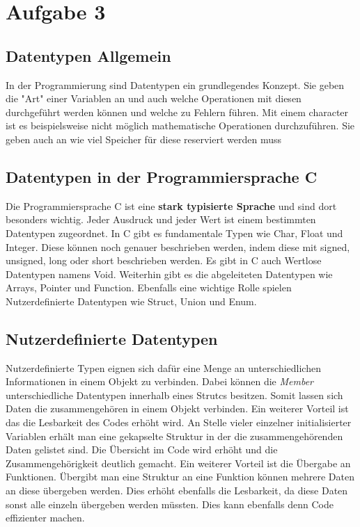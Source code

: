 \chapter{Aufgabe 3}
\section{Datentypen Allgemein}
In der Programmierung sind Datentypen ein grundlegendes Konzept.
Sie geben die "Art" einer Variablen an und auch welche Operationen mit diesen durchgeführt werden können und welche zu Fehlern führen.
Mit einem character ist es beispielsweise nicht möglich mathematische Operationen durchzuführen.
Sie geben auch an wie viel Speicher für diese reserviert werden muss\cite{datentypen:2022} 

\section{Datentypen in der Programmiersprache C}
Die Programmiersprache C ist eine \textbf{stark typisierte Sprache} und sind dort besonders wichtig.
Jeder Ausdruck und jeder Wert ist einem bestimmten Datentypen zugeordnet.
In C gibt es fundamentale Typen wie Char, Float und Integer.
Diese können noch genauer beschrieben werden, indem diese mit signed, unsigned, long oder short beschrieben werden.
Es gibt in C auch Wertlose Datentypen namens Void.
Weiterhin gibt es die abgeleiteten Datentypen wie Arrays, Pointer und Function.
Ebenfalls eine wichtige Rolle spielen Nutzerdefinierte Datentypen wie Struct, Union und Enum\cite{boekelmann:2023}.

\section{Nutzerdefinierte Datentypen}
Nutzerdefinierte Typen eignen sich dafür eine Menge an unterschiedlichen Informationen in einem Objekt zu verbinden.
Dabei können die \textit{Member} unterschiedliche Datentypen innerhalb eines Strutcs besitzen\cite{boekelmann:2023}.
Somit lassen sich Daten die zusammengehören in einem Objekt verbinden.
Ein weiterer Vorteil ist das die Lesbarkeit des Codes erhöht wird.
An Stelle vieler einzelner initialisierter Variablen erhält man eine gekapselte Struktur in der die zusammengehörenden Daten gelistet sind.
Die Übersicht im Code wird erhöht und die Zusammengehörigkeit deutlich gemacht.
Ein weiterer Vorteil ist die Übergabe an Funktionen.
Übergibt man eine Struktur an eine Funktion können mehrere Daten an diese übergeben werden.
Dies erhöht ebenfalls die Lesbarkeit, da diese Daten sonst alle einzeln übergeben werden müssten.
Dies kann ebenfalls denn Code effizienter machen.

